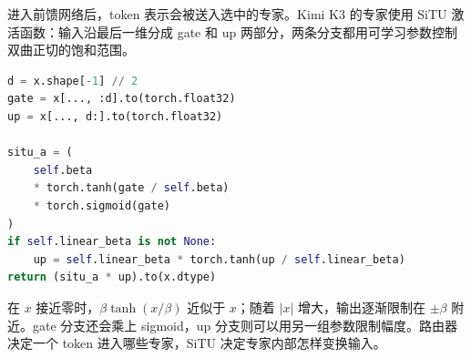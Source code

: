进入前馈网络后，token 表示会被送入选中的专家。Kimi K3 的专家使用 SiTU 激活函数：输入沿最后一维分成 gate 和 up 两部分，两条分支都用可学习参数控制双曲正切的饱和范围。

\begin{lstlisting}[language=Python,caption={SiTU 激活函数}]
d = x.shape[-1] // 2
gate = x[..., :d].to(torch.float32)
up = x[..., d:].to(torch.float32)

situ_a = (
    self.beta
    * torch.tanh(gate / self.beta)
    * torch.sigmoid(gate)
)
if self.linear_beta is not None:
    up = self.linear_beta * torch.tanh(up / self.linear_beta)
return (situ_a * up).to(x.dtype)
\end{lstlisting}

在 $x$ 接近零时，$\beta\tanh(x/\beta)$ 近似于 $x$；随着 $|x|$ 增大，输出逐渐限制在 $\pm\beta$ 附近。gate 分支还会乘上 sigmoid，up 分支则可以用另一组参数限制幅度。路由器决定一个 token 进入哪些专家，SiTU 决定专家内部怎样变换输入。

